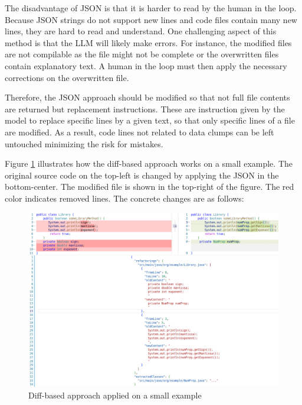 The disadvantage of \ac{JSON} is that it is harder to read by the human in the loop. Because JSON strings do not support new lines and code files contain many new lines, they are hard to read and understand.
One challenging aspect of this method is that the \ac{LLM} will likely make errors. For instance, the modified files are not compilable as the file might not be complete or the  overwritten files contain explanatory text. A human in the loop must then apply the necessary corrections on the overwritten file.



Therefore, the \ac{JSON} approach should be modified so that not full file contents are returned but replacement instructions. These are instruction given by the model to replace specific lines by a given text, so that only specific lines of a file are modified.  As a result, code lines not related to data clumps can be left untouched minimizing the risk for mistakes. 


Figure \ref{fig:json_based_changes} illustrates how the diff-based approach works on a small example. The original source code on the top-left is changed by applying the \ac{JSON} in the bottom-center. The modified file is shown in the top-right of the figure. The red color indicates removed lines. The concrete changes are as follows:
\begin{figure}
    \centering
    \includegraphics[width=\columnwidth]{figures/chapter4/diff_original_changed_vscode_cmp.png}
    \caption{Diff-based approach applied on a small example}
    \label{fig:json_based_changes}
\end{figure}


